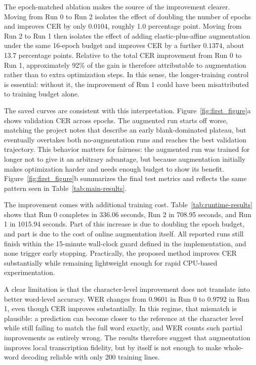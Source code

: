 \documentclass{article} %
\begin{document}
The epoch-matched ablation makes the source of the improvement clearer. Moving from Run 0 to Run 2 isolates the effect of doubling the number of epochs and improves CER by only \(0.0104\), roughly 1.0 percentage point. Moving from Run 2 to Run 1 then isolates the effect of adding elastic-plus-affine augmentation under the same 16-epoch budget and improves CER by a further \(0.1374\), about 13.7 percentage points. Relative to the total CER improvement from Run 0 to Run 1, approximately 92\% of the gain is therefore attributable to augmentation rather than to extra optimization steps. In this sense, the longer-training control is essential: without it, the improvement of Run 1 could have been misattributed to training budget alone.

The saved curves are consistent with this interpretation. Figure~\ref{fig:first_figure}a shows validation CER across epochs. The augmented run starts off worse, matching the project notes that describe an early blank-dominated plateau, but eventually overtakes both no-augmentation runs and reaches the best validation trajectory. This behavior matters for fairness: the augmented run was trained for longer not to give it an arbitrary advantage, but because augmentation initially makes optimization harder and needs enough budget to show its benefit. Figure~\ref{fig:first_figure}b summarizes the final test metrics and reflects the same pattern seen in Table~\ref{tab:main-results}.

The improvement comes with additional training cost. Table~\ref{tab:runtime-results} shows that Run 0 completes in 336.06 seconds, Run 2 in 708.95 seconds, and Run 1 in 1015.94 seconds. Part of this increase is due to doubling the epoch budget, and part is due to the cost of online augmentation itself. All reported runs still finish within the 15-minute wall-clock guard defined in the implementation, and none trigger early stopping. Practically, the proposed method improves CER substantially while remaining lightweight enough for rapid CPU-based experimentation.

A clear limitation is that the character-level improvement does not translate into better word-level accuracy. WER changes from \(0.9601\) in Run 0 to \(0.9792\) in Run 1, even though CER improves substantially. In this regime, that mismatch is plausible: a prediction can become closer to the reference at the character level while still failing to match the full word exactly, and WER counts such partial improvements as entirely wrong. The results therefore suggest that augmentation improves local transcription fidelity, but by itself is not enough to make whole-word decoding reliable with only 200 training lines.
\end{document}
